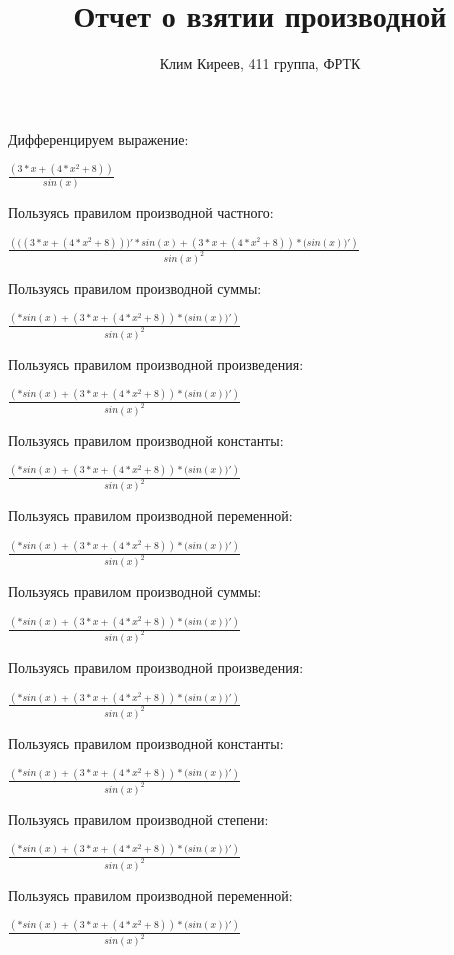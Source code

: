 \documentclass[a4paper,20pt]{article}
\title{Отчет о взятии производной}
\author{Клим Киреев, 411 группа, ФРТК}
\date{}
\begin{document}
	\maketitle
	\newpage
{\large

Дифференцируем выражение:

${\frac{({{3}*{x}}+{({{4}*{{x}^{2}}}+{8})})}{sin({x})}}$

Пользуясь правилом производной частного:

${\frac{({{(({{3}*{x}}+{({{4}*{{x}^{2}}}+{8})})})'*{sin({x})}}+{{({{3}*{x}}+{({{4}*{{x}^{2}}}+{8})})}*{(sin({x})})'})}{{sin({x})}^{2}}}$

Пользуясь правилом производной суммы:

${\frac{({*{sin({x})}}+{{({{3}*{x}}+{({{4}*{{x}^{2}}}+{8})})}*{(sin({x})})'})}{{sin({x})}^{2}}}$

Пользуясь правилом производной произведения:

${\frac{({*{sin({x})}}+{{({{3}*{x}}+{({{4}*{{x}^{2}}}+{8})})}*{(sin({x})})'})}{{sin({x})}^{2}}}$

Пользуясь правилом производной константы:

${\frac{({*{sin({x})}}+{{({{3}*{x}}+{({{4}*{{x}^{2}}}+{8})})}*{(sin({x})})'})}{{sin({x})}^{2}}}$

Пользуясь правилом производной переменной:

${\frac{({*{sin({x})}}+{{({{3}*{x}}+{({{4}*{{x}^{2}}}+{8})})}*{(sin({x})})'})}{{sin({x})}^{2}}}$

Пользуясь правилом производной суммы:

${\frac{({*{sin({x})}}+{{({{3}*{x}}+{({{4}*{{x}^{2}}}+{8})})}*{(sin({x})})'})}{{sin({x})}^{2}}}$

Пользуясь правилом производной произведения:

${\frac{({*{sin({x})}}+{{({{3}*{x}}+{({{4}*{{x}^{2}}}+{8})})}*{(sin({x})})'})}{{sin({x})}^{2}}}$

Пользуясь правилом производной константы:

${\frac{({*{sin({x})}}+{{({{3}*{x}}+{({{4}*{{x}^{2}}}+{8})})}*{(sin({x})})'})}{{sin({x})}^{2}}}$

Пользуясь правилом производной степени:

${\frac{({*{sin({x})}}+{{({{3}*{x}}+{({{4}*{{x}^{2}}}+{8})})}*{(sin({x})})'})}{{sin({x})}^{2}}}$

Пользуясь правилом производной переменной:

${\frac{({*{sin({x})}}+{{({{3}*{x}}+{({{4}*{{x}^{2}}}+{8})})}*{(sin({x})})'})}{{sin({x})}^{2}}}$

}
\end{document}
